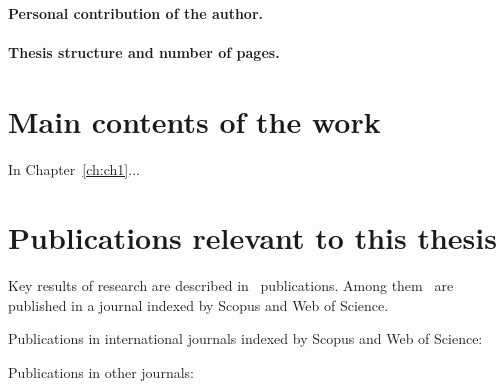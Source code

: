\paragraph*{Personal contribution of the author.}
\paragraph*{Thesis structure and number of pages.}

\newpage
\section*{Main contents of the work}

In Chapter~\ref{ch:ch1}...

\section*{Publications relevant to this thesis}
Key results of research are described in \theAllPapers~publications. Among them \theScopusPapers~are published in a journal indexed by Scopus and Web of Science. 

Publications in international journals indexed by Scopus and Web of Science:
\insertpapperScopus

Publications in other journals:
\insertpapperOther